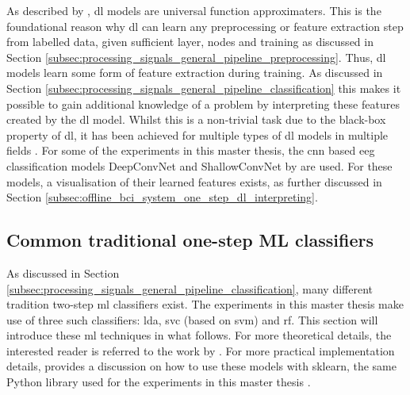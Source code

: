 As described by \citet{nn_can_learn_from_raw}, \gls{dl} models are universal function approximaters.
This is the foundational reason why \gls{dl} can learn any preprocessing or feature extraction step from labelled data, given sufficient layer, nodes and training as discussed in Section \ref{subsec:processing_signals_general_pipeline_preprocessing}.
Thus, \gls{dl} models learn some form of feature extraction during training.
As discussed in Section \ref{subsec:processing_signals_general_pipeline_classification} this makes it possible to gain additional knowledge of a problem by interpreting these features created by the \gls{dl} model.
Whilst this is a non-trivial task due to the black-box property of \gls{dl}, it has been achieved for multiple types of \gls{dl} models in multiple fields \citep{eeg_model_hbm, black_box_insight1, black_box_insight2}.
For some of the experiments in this master thesis, the \gls{cnn} based \gls{eeg} classification models DeepConvNet and ShallowConvNet by \citet{eeg_model_hbm} are used. 
For these models, a visualisation of their learned features exists, as further discussed in Section \ref{subsec:offline_bci_system_one_step_dl_interpreting}.


\subsection{Common traditional one-step ML classifiers}
\label{subsec:processing_signals_ml_and_dl_ml_classifiers}



As discussed in Section \ref{subsec:processing_signals_general_pipeline_classification}, many different tradition two-step \gls{ml} classifiers exist.
The experiments in this master thesis make use of three such classifiers: \gls{lda}, \gls{svc} (based on \gls{svm}) and \gls{rf}.
This section will introduce these \gls{ml} techniques in what follows.
For more theoretical details, the interested reader is referred to the work by \citet{ml_book}.
For more practical implementation details, \citet{ml_dl_book} provides a discussion on how to use these models with \gls{sklearn}, the same Python library used for the experiments in this master thesis \citep{sklearn}.



